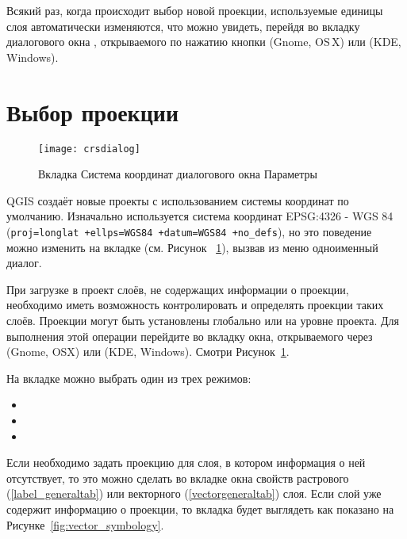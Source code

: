 Всякий раз, когда происходит выбор новой проекции, используемые единицы
слоя автоматически изменяются, что можно увидеть, перейдя во вкладку
 диалогового окна , открываемого по нажатию кнопки  (Gnome,
OS\,X) или  (KDE, Windows).

\section{Выбор проекции}
\label{sec:projection-specifying}

\begin{figure}[bt]
   \centering
   \texttt{[image: crsdialog]}
   \caption{Вкладка Система координат диалогового окна Параметры \wincaption}\label{fig:crsdialog}
\end{figure}

QGIS создаёт новые проекты с использованием системы координат по умолчанию.
Изначально используется система координат EPSG:4326 - WGS 84 (\texttt{proj=longlat
+ellps=WGS84 +datum=WGS84 +no\_defs}), но это поведение можно изменить
на вкладке  (см. Рисунок ~\ref{fig:crsdialog}),
вызвав из меню  \arrow {}
одноименный диалог.

При загрузке в проект слоёв, не содержащих информации о проекции, необходимо
иметь возможность контролировать и определять проекции таких слоёв. Проекции
могут быть установлены глобально или на уровне проекта. Для выполнения этой
операции перейдите во вкладку  окна, открываемого
через  \arrow {}
(Gnome, OSX) или  \arrow {}
(KDE, Windows). Смотри Рисунок~\ref{fig:crsdialog}.

На вкладке  можно выбрать один из трех режимов:
\begin{itemize}[label=--]
\item {}
\item {}
\item {}
\end{itemize}

Если необходимо задать проекцию для слоя, в котором информация о ней
отсутствует, то это можно сделать во вкладке  окна свойств растрового
(\ref{label_generaltab}) или векторного (\ref{vectorgeneraltab}) слоя. Если
слой уже содержит информацию о проекции, то вкладка будет выглядеть как показано
на Рисунке~\ref{fig:vector_symbology}.

